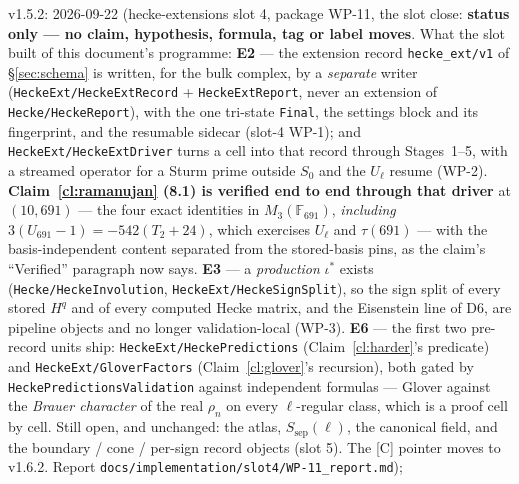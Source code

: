\documentclass[11pt]{article}
\theoremstyle{remark}
\newcommand{\F}{\mathbb{F}}
\begin{document}
v1.5.2: 2026-09-22 (hecke-extensions slot 4, package WP-11, the slot close:
\textbf{status only --- no claim, hypothesis, formula, tag or label moves}. What the slot
built of this document's programme: \textbf{E2} --- the extension record \texttt{hecke\_ext/v1}
of \S\ref{sec:schema} is written, for the bulk complex, by a \emph{separate} writer
(\texttt{HeckeExt/HeckeExtRecord} + \texttt{HeckeExtReport}, never an extension of
\texttt{Hecke/HeckeReport}), with the one tri-state \texttt{Final}, the settings block and
its fingerprint, and the resumable sidecar (slot-4 WP-1); and
\texttt{HeckeExt/HeckeExtDriver} turns a cell into that record through Stages~1--5, with a
streamed operator for a Sturm prime outside $S_0$ and the $U_\ell$ resume (WP-2).
\textbf{Claim~\ref{cl:ramanujan} (8.1) is verified end to end through that driver} at
$(10,691)$ --- the four exact identities in $M_3(\F_{691})$, \emph{including}
$3(U_{691}-1)=-542(T_2+24)$, which exercises $U_\ell$ and $\tau(691)$ --- with the
basis-independent content separated from the stored-basis pins, as the claim's
``Verified'' paragraph now says. \textbf{E3} --- a \emph{production} $\iota^{\ast}$ exists
(\texttt{Hecke/HeckeInvolution}, \texttt{HeckeExt/HeckeSignSplit}), so the sign split of
every stored $H^q$ and of every computed Hecke matrix, and the Eisenstein line of D6, are
pipeline objects and no longer validation-local (WP-3). \textbf{E6} --- the first two
pre-record units ship: \texttt{HeckeExt/HeckePredictions} (Claim~\ref{cl:harder}'s
predicate) and \texttt{HeckeExt/GloverFactors} (Claim~\ref{cl:glover}'s recursion), both
gated by \texttt{HeckePredictionsValidation} against independent formulas --- Glover
against the \emph{Brauer character} of the real $\rho_n$ on every $\ell$-regular class,
which is a proof cell by cell. Still open, and unchanged: the atlas, $S_{\mathrm{sep}}(\ell)$,
the canonical field, and the boundary / cone / per-sign record objects (slot 5). The [C]
pointer moves to v1.6.2. Report \texttt{docs/implementation/slot4/WP-11\_report.md});
\end{document}
